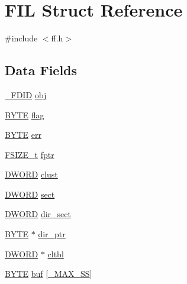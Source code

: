 \hypertarget{structFIL}{}\section{F\+IL Struct Reference}
\label{structFIL}


{\ttfamily \#include $<$ff.\+h$>$}

\subsection*{Data Fields}
\begin{DoxyCompactItemize}
\item 
\hyperlink{struct__FDID}{\+\_\+\+F\+D\+ID} \hyperlink{structFIL_ae7242545ea88ea2602484122ebe65fa3}{obj}
\item 
\hyperlink{integer_8h_a4ae1dab0fb4b072a66584546209e7d58}{B\+Y\+TE} \hyperlink{structFIL_ac409508881f5a16f2998ae675072b376}{flag}
\item 
\hyperlink{integer_8h_a4ae1dab0fb4b072a66584546209e7d58}{B\+Y\+TE} \hyperlink{structFIL_aea440945db26de9c4a88065c0c887fda}{err}
\item 
\hyperlink{ff_8h_a3fc0992ad7436250b6b1a0592214b7f2}{F\+S\+I\+Z\+E\+\_\+t} \hyperlink{structFIL_a088b03ab2e02f82e10e17bdd938190a6}{fptr}
\item 
\hyperlink{integer_8h_ad342ac907eb044443153a22f964bf0af}{D\+W\+O\+RD} \hyperlink{structFIL_aa41312aba551b9a6d1c9d3c8c7d2734b}{clust}
\item 
\hyperlink{integer_8h_ad342ac907eb044443153a22f964bf0af}{D\+W\+O\+RD} \hyperlink{structFIL_affec18b48fe716fdae6a60123fc61145}{sect}
\item 
\hyperlink{integer_8h_ad342ac907eb044443153a22f964bf0af}{D\+W\+O\+RD} \hyperlink{structFIL_ab203794f939ad4480e81dfa488770783}{dir\+\_\+sect}
\item 
\hyperlink{integer_8h_a4ae1dab0fb4b072a66584546209e7d58}{B\+Y\+TE} $\ast$ \hyperlink{structFIL_a5af9e9fb312b629220eaf684dd28c4a9}{dir\+\_\+ptr}
\item 
\hyperlink{integer_8h_ad342ac907eb044443153a22f964bf0af}{D\+W\+O\+RD} $\ast$ \hyperlink{structFIL_a28a30613d48cefcf9efbd334cd861fc8}{cltbl}
\item 
\hyperlink{integer_8h_a4ae1dab0fb4b072a66584546209e7d58}{B\+Y\+TE} \hyperlink{structFIL_a7a95fb86588663e48309b5cded7e207b}{buf} \mbox{[}\hyperlink{ffconf_8h_ac271b697378912f17132cb9c7d0de024}{\+\_\+\+M\+A\+X\+\_\+\+SS}\mbox{]}
\end{DoxyCompactItemize}


